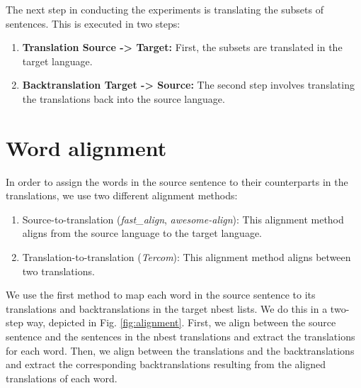 The next step in conducting the experiments is translating the subsets of sentences. This is executed in two steps:

\begin{enumerate}
    \item \textbf{Translation Source -> Target:} 
    First, the subsets are translated in the target language.
    \item \textbf{Backtranslation Target -> Source:}
    The second step involves translating the translations back into the source language.
\end{enumerate}




\section{Word alignment}
\label{sec:Base_Experiment:Alignment}


In order to assign the words in the source sentence to their counterparts in the translations, we use two different alignment methods:

\begin{enumerate}
    \item Source-to-translation (\textit{fast\_align}, \textit{awesome-align}): This alignment method aligns from the source language to the target language.
    \item Translation-to-translation (\textit{Tercom}): This alignment method aligns between two translations.
\end{enumerate}

We use the first method to map each word in the source sentence to its translations and backtranslations in the target nbest lists. We do this in a two-step way, depicted in Fig. \ref{fig:alignment}. First, we align between the source sentence and the sentences in the nbest translations and extract the translations for each word. Then, we align between the translations and the backtranslations and extract the corresponding backtranslations resulting from the aligned translations of each word. 

